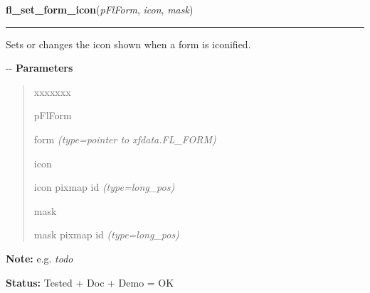\hspace{.8\funcindent}\begin{boxedminipage}{\funcwidth}

    \raggedright \textbf{fl\_set\_form\_icon}(\textit{pFlForm}, \textit{icon}, \textit{mask})

    \vspace{-1.5ex}

    \rule{\textwidth}{0.5\fboxrule}
\setlength{\parskip}{2ex}

Sets or changes the icon shown when a form is iconified.

-{}-
\setlength{\parskip}{1ex}
      \textbf{Parameters}
      \vspace{-1ex}

      \begin{quote}
        \begin{Ventry}{xxxxxxx}

          \item[pFlForm]


form
            {\it (type=pointer to xfdata.FL\_FORM)}

          \item[icon]


icon pixmap id
            {\it (type=long\_pos)}

          \item[mask]


mask pixmap id
            {\it (type=long\_pos)}

        \end{Ventry}

      \end{quote}

\textbf{Note:} 
e.g. \emph{todo}


\textbf{Status:} 
Tested + Doc + Demo = OK


    \end{boxedminipage}

    \label{xformslib:flxbasic:fl_get_decoration_sizes}

    \vspace{0.5ex}

